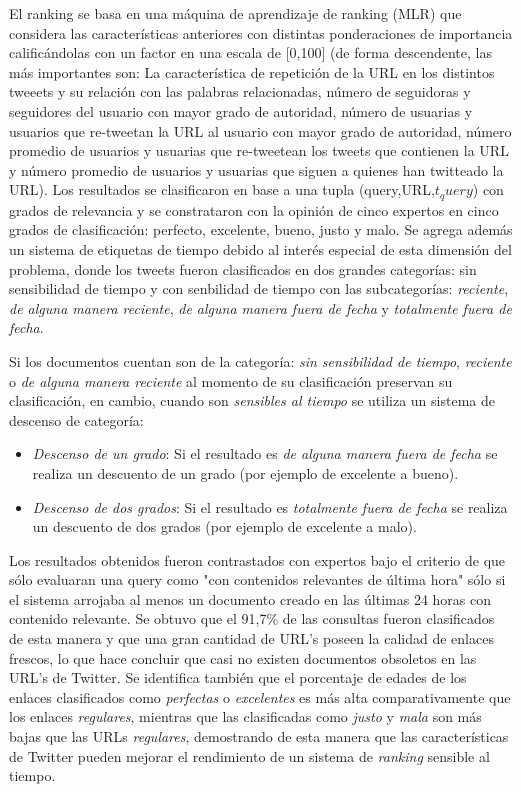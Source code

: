 	El ranking se basa en una máquina de aprendizaje de ranking (MLR) que considera las características anteriores con distintas ponderaciones de importancia calificándolas con un factor en una escala de [0,100] (de forma descendente, las más importantes son: La característica de repetición de la URL en los distintos tweeets y su relación con las palabras relacionadas, número de seguidoras y seguidores del usuario con mayor grado de autoridad, número de usuarias y usuarios que re-tweetan la URL al usuario con mayor grado de autoridad, número promedio de usuarios y usuarias que re-tweetean los tweets que contienen la URL y número promedio de usuarios y usuarias que siguen a quienes han twitteado la URL). Los resultados se clasificaron en base a una tupla (query,URL,$t_query$) con grados de relevancia y se constrataron con la opinión de cinco expertos en cinco grados de clasificación: perfecto, excelente, bueno, justo y malo. Se agrega además un sistema de etiquetas de tiempo debido al interés especial de esta dimensión del problema, donde los tweets fueron clasificados en dos grandes categorías: sin sensibilidad de tiempo y con senbilidad de tiempo con las subcategorías: \emph{reciente}, \emph{de alguna manera reciente}, \emph{de alguna manera fuera de fecha} y \emph{totalmente fuera de fecha}.
	
	Si los documentos cuentan son de la categoría: \emph{sin sensibilidad de tiempo}, \emph{reciente} o \emph{de alguna manera reciente} al momento de su clasificación preservan su clasificación, en cambio, cuando son \emph{sensibles al tiempo} se utiliza un sistema de descenso de categoría:
	
	\begin{itemize}
		\item \emph{Descenso de un grado}: Si el resultado es \emph{de alguna manera fuera de fecha} se realiza un descuento de un grado (por ejemplo de excelente a bueno).
		\item \emph{Descenso de dos grados}: Si el resultado es \emph{totalmente fuera de fecha} se realiza un descuento de dos grados (por ejemplo de excelente a malo).
	\end{itemize}
	
	Los resultados obtenidos fueron contrastados con expertos bajo el criterio de que sólo evaluaran una query como "con contenidos relevantes de última hora" sólo si el sistema arrojaba al menos un documento creado en las últimas 24 horas con contenido relevante. Se obtuvo que el 91,7\% de las consultas fueron clasificados de esta manera y que una gran cantidad de URL's poseen la calidad de enlaces frescos, lo que hace concluir que casi no existen documentos obsoletos en las URL's de Twitter. Se identifica también que el porcentaje de edades de los enlaces clasificados como \emph{perfectas} o \emph{excelentes} es más alta comparativamente que los enlaces \emph{regulares}, mientras que las clasificadas como \emph{justo} y \emph{mala} son más bajas que las URLs \emph{regulares}, demostrando de esta manera que las características de Twitter pueden mejorar el rendimiento de un sistema de \emph{ranking} sensible al tiempo.  
	
